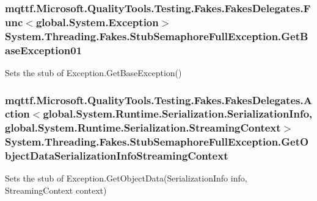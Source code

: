 \hypertarget{class_system_1_1_threading_1_1_fakes_1_1_stub_semaphore_full_exception_af5fa11ca6fdde7b3239109a9a2cc60e0}{
\subsubsection[{Get\-Base\-Exception01}]{\setlength{\rightskip}{0pt plus 5cm}mqttf.\-Microsoft.\-Quality\-Tools.\-Testing.\-Fakes.\-Fakes\-Delegates.\-Func$<$global.\-System.\-Exception$>$ System.\-Threading.\-Fakes.\-Stub\-Semaphore\-Full\-Exception.\-Get\-Base\-Exception01}}\label{class_system_1_1_threading_1_1_fakes_1_1_stub_semaphore_full_exception_af5fa11ca6fdde7b3239109a9a2cc60e0}


Sets the stub of Exception.\-Get\-Base\-Exception()

\hypertarget{class_system_1_1_threading_1_1_fakes_1_1_stub_semaphore_full_exception_a7161b8b313bc954fc96ba3ff3434315d}{
\subsubsection[{Get\-Object\-Data\-Serialization\-Info\-Streaming\-Context}]{\setlength{\rightskip}{0pt plus 5cm}mqttf.\-Microsoft.\-Quality\-Tools.\-Testing.\-Fakes.\-Fakes\-Delegates.\-Action$<$global.\-System.\-Runtime.\-Serialization.\-Serialization\-Info, global.\-System.\-Runtime.\-Serialization.\-Streaming\-Context$>$ System.\-Threading.\-Fakes.\-Stub\-Semaphore\-Full\-Exception.\-Get\-Object\-Data\-Serialization\-Info\-Streaming\-Context}}\label{class_system_1_1_threading_1_1_fakes_1_1_stub_semaphore_full_exception_a7161b8b313bc954fc96ba3ff3434315d}


Sets the stub of Exception.\-Get\-Object\-Data(\-Serialization\-Info info, Streaming\-Context context)

